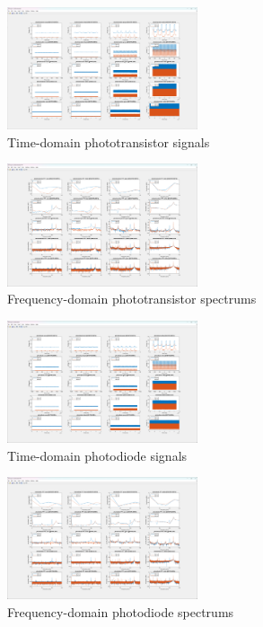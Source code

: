 \documentclass[conference]{IEEEtran}
\begin{document}
\begin{figure}[htbp]
	\centerline{\includegraphics[width=0.5\textwidth]{phototransistor-time.png}}
	\caption{Time-domain phototransistor signals}
	\label{fig:phototransistor-time}
\end{figure}
\begin{figure}[htbp]
	\centerline{\includegraphics[width=0.5\textwidth]{phototransistor-frequency.png}}
	\caption{Frequency-domain phototransistor spectrums}
	\label{fig:phototransistor-frequency}
\end{figure}
\begin{figure}[htbp]
	\centerline{\includegraphics[width=0.5\textwidth]{photodiode-time.png}}
	\caption{Time-domain photodiode signals}
	\label{fig:photodiode-time}
\end{figure}
\begin{figure}[htbp]
	\centerline{\includegraphics[width=0.5\textwidth]{photodiode-frequency.png}}
	\caption{Frequency-domain photodiode spectrums}
	\label{fig:photodiode-frequency}
\end{figure}
\end{document}
